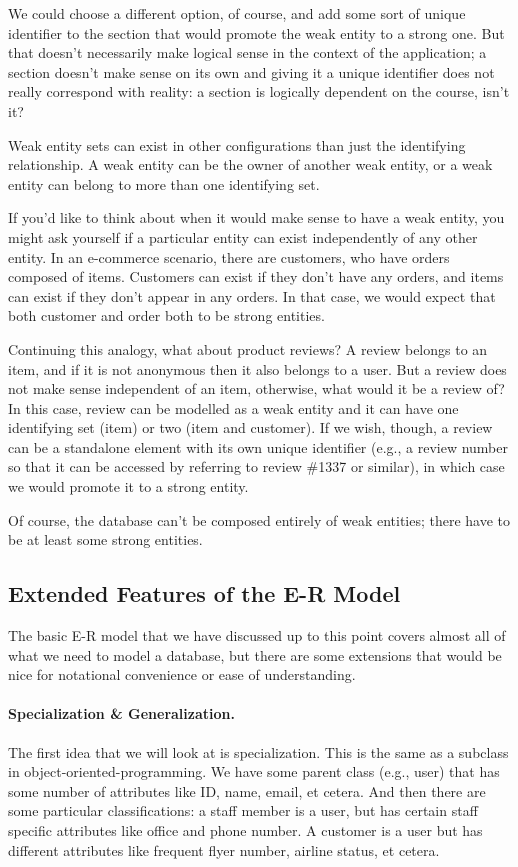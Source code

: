 We could choose a different option, of course, and add some sort of unique identifier to the section that would promote the weak entity to a strong one. But that doesn't necessarily make logical sense in the context of the application; a section doesn't make sense on its own and giving it a unique identifier does not really correspond with reality: a section is logically dependent on the course, isn't it?

Weak entity sets can exist in other configurations than just the identifying relationship. A weak entity can be the owner of another weak entity, or a weak entity can belong to more than one identifying set.

If you'd like to think about when it would make sense to have a weak entity, you might ask yourself if a particular entity can exist independently of any other entity. In an e-commerce scenario, there are customers, who have orders composed of items. Customers can exist if they don't have any orders, and items can exist if they don't appear in any orders. In that case, we would expect that both customer and order both to be strong entities.

Continuing this analogy, what about product reviews? A review belongs to an item, and if it is not anonymous then it also belongs to a user. But a review does not make sense independent of an item, otherwise, what would it be a review of? In this case, review can be modelled as a weak entity and it can have one identifying set (item) or two (item and customer). If we wish, though, a review can be a standalone element with its own unique identifier (e.g., a review number so that it can be accessed by referring to review \#1337 or similar), in which case we would promote it to a strong entity.

Of course, the database can't be composed entirely of weak entities; there have to be at least some strong entities. 

\subsection*{Extended Features of the E-R Model}
The basic E-R model that we have discussed up to this point covers almost all of what we need to model a database, but there are some extensions that would be nice for notational convenience or ease of understanding.

\paragraph{Specialization \& Generalization.} The first idea that we will look at is specialization. This is the same as a subclass in object-oriented-programming. We have some parent class (e.g., user) that has some number of attributes like ID, name, email, et cetera. And then there are some particular classifications: a staff member is a user, but has certain staff specific attributes like office and phone number. A customer is a user but has different attributes like frequent flyer number, airline status, et cetera. 


